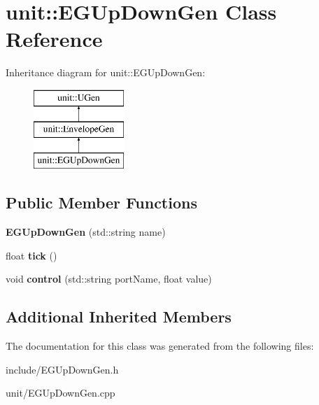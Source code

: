 \hypertarget{classunit_1_1EGUpDownGen}{}\section{unit\+:\+:E\+G\+Up\+Down\+Gen Class Reference}
\label{classunit_1_1EGUpDownGen}
Inheritance diagram for unit\+:\+:E\+G\+Up\+Down\+Gen\+:\begin{figure}[H]
\begin{center}
\leavevmode
\includegraphics[height=3.000000cm]{classunit_1_1EGUpDownGen}
\end{center}
\end{figure}
\subsection*{Public Member Functions}
\begin{DoxyCompactItemize}
\item 
{\bfseries E\+G\+Up\+Down\+Gen} (std\+::string name)\hypertarget{classunit_1_1EGUpDownGen_abc35a572da36fa26f4b54beabfc6268e}{}\label{classunit_1_1EGUpDownGen_abc35a572da36fa26f4b54beabfc6268e}

\item 
float {\bfseries tick} ()\hypertarget{classunit_1_1EGUpDownGen_abea11de5389345064a8395d54411e3b3}{}\label{classunit_1_1EGUpDownGen_abea11de5389345064a8395d54411e3b3}

\item 
void {\bfseries control} (std\+::string port\+Name, float value)\hypertarget{classunit_1_1EGUpDownGen_ac1ef59d9023034c17b46e09bfae15178}{}\label{classunit_1_1EGUpDownGen_ac1ef59d9023034c17b46e09bfae15178}

\end{DoxyCompactItemize}
\subsection*{Additional Inherited Members}


The documentation for this class was generated from the following files\+:\begin{DoxyCompactItemize}
\item 
include/E\+G\+Up\+Down\+Gen.\+h\item 
unit/E\+G\+Up\+Down\+Gen.\+cpp\end{DoxyCompactItemize}
